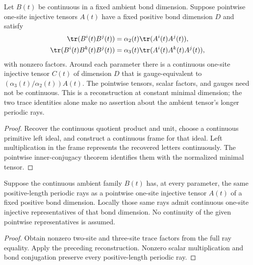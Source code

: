 \begin{lemma}
    \label{thm:spt_continuous_minimal_finite_trace_realization}
    \leanok
    Let $B(t)$ be continuous in a fixed ambient bond dimension.
    Suppose pointwise one-site injective tensors $A(t)$ have a fixed
    positive bond dimension $D$ and satisfy
    \begin{align}
        \tr(B^i(t)B^j(t))       & =\alpha_2(t)\tr(A^i(t)A^j(t)),
        \notag                                                   \\
        \tr(B^i(t)B^k(t)B^j(t)) & =
        \alpha_3(t)\tr(A^i(t)A^k(t)A^j(t)),
        \notag
    \end{align}
    with nonzero factors. Around each parameter there is a continuous
    one-site injective tensor $C(t)$ of dimension $D$ that is
    gauge-equivalent to $(\alpha_3(t)/\alpha_2(t))A(t)$.
    The pointwise tensors, scalar factors, and gauges need not be
    continuous. This is a reconstruction at constant minimal
    dimension; the two trace identities alone make no assertion about
    the ambient tensor's longer periodic rays.
\end{lemma}
\begin{proof}\leanok
    Recover the continuous quotient product and unit, choose a
    continuous primitive left ideal, and construct a continuous frame
    for that ideal. Left multiplication in the frame represents
    the recovered letters continuously. The pointwise inner-conjugacy
    theorem identifies them with the normalized minimal tensor.
\end{proof}

\begin{lemma}
    \label{thm:spt_continuous_minimal_ray_realization}
    \leanok
    Suppose the continuous ambient family $B(t)$ has, at every parameter,
    the same positive-length periodic rays as a pointwise one-site
    injective tensor $A(t)$ of a fixed positive bond dimension.
    Locally those same rays admit continuous one-site injective
    representatives of that bond dimension. No continuity of the
    given pointwise representatives is assumed.
\end{lemma}
\begin{proof}\leanok
    Obtain nonzero two-site and three-site trace factors from the
    full ray equality. Apply the preceding reconstruction.
    Nonzero scalar multiplication and bond conjugation preserve
    every positive-length periodic ray.
\end{proof}

